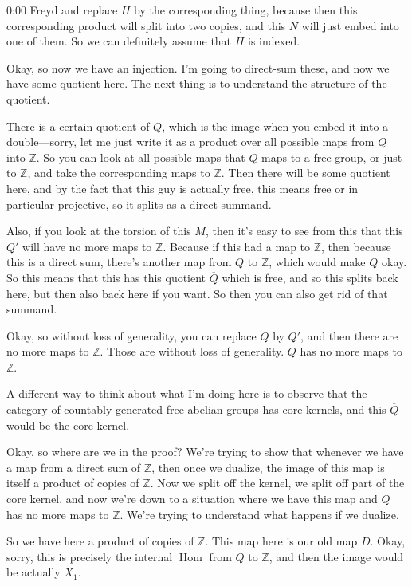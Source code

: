 \begin{unfinished}{0:00}
Freyd and replace $H$ by the corresponding thing, because then this corresponding product will split into two copies, and this $N$ will just embed into one of them. So we can definitely assume that $H$ is indexed.

Okay, so now we have an injection. I'm going to direct-sum these, and now we have some quotient here. The next thing is to understand the structure of the quotient.

There is a certain quotient of $Q$, which is the image when you embed it into a double---sorry, let me just write it as a product over all possible maps from $Q$ into $\mathbb{Z}$. So you can look at all possible maps that $Q$ maps to a free group, or just to $\mathbb{Z}$, and take the corresponding maps to $\mathbb{Z}$. Then there will be some quotient here, and by the fact that this guy is actually free, this means free or in particular projective, so it splits as a direct summand.

Also, if you look at the torsion of this $M$, then it's easy to see from this that this $Q'$ will have no more maps to $\mathbb{Z}$. Because if this had a map to $\mathbb{Z}$, then because this is a direct sum, there's another map from $Q$ to $\mathbb{Z}$, which would make $Q$ okay. So this means that this has this quotient $\overline{Q}$ which is free, and so this splits back here, but then also back here if you want. So then you can also get rid of that summand.

Okay, so without loss of generality, you can replace $Q$ by $Q'$, and then there are no more maps to $\mathbb{Z}$. Those are without loss of generality. $Q$ has no more maps to $\mathbb{Z}$.

A different way to think about what I'm doing here is to observe that the category of countably generated free abelian groups has core kernels, and this $\overline{Q}$ would be the core kernel.

Okay, so where are we in the proof? We're trying to show that whenever we have a map from a direct sum of $\mathbb{Z}$, then once we dualize, the image of this map is itself a product of copies of $\mathbb{Z}$. Now we split off the kernel, we split off part of the core kernel, and now we're down to a situation where we have this map and $Q$ has no more maps to $\mathbb{Z}$. We're trying to understand what happens if we dualize.

So we have here a product of copies of $\mathbb{Z}$. This map here is our old map $D$. Okay, sorry, this is precisely the internal $\operatorname{Hom}$ from $Q$ to $\mathbb{Z}$, and then the image would be actually $X_1$.


\end{unfinished}
